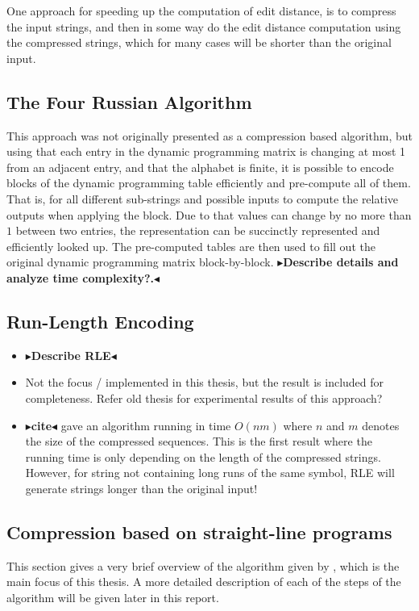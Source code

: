 \documentclass[twoside,11pt,openright]{report}
\newcommand{\todo}[1]{{\color[rgb]{.5,0,0}\textbf{$\blacktriangleright$#1$\blacktriangleleft$}}}
\begin{document}
One approach for speeding up the computation of edit distance, is to compress the input strings, and then in some way do the edit distance computation using the compressed strings, which for many cases will be shorter than the original input.

\subsection{The Four Russian Algorithm}
\label{sec:4-russian}
This approach was not originally presented as a compression based algorithm, but using that each entry in the dynamic programming matrix is changing at most 1 from an adjacent entry, and that the alphabet is finite, it is possible to encode blocks of the dynamic programming table efficiently and pre-compute all of them. That is, for all different sub-strings and possible inputs to compute the relative outputs when applying the block. Due to that values can change by no more than $1$ between two entries, the representation can be succinctly represented and efficiently looked up. The pre-computed tables are then used to fill out the original dynamic programming matrix block-by-block.
\todo{Describe details and analyze time complexity?.}

\subsection{Run-Length Encoding}
\begin{itemize}
  \item \todo{Describe RLE}
  \item Not the focus / implemented in this thesis, but the result is included for completeness. Refer old thesis for experimental results of this approach?
  \item \todo{cite} gave an algorithm running in time $O(nm)$ where $n$ and $m$ denotes the size of the compressed sequences. This is the first result where the running time is only depending on the length of the compressed strings. However, for string not containing long runs of the same symbol, RLE will generate strings longer than the original input!
\end{itemize}

\subsection{Compression based on straight-line programs}
\label{sec:edit-dist-on-slps-steps}
This section gives a very brief overview of the algorithm given by \cite{Gawrychowski:2012:FAC:2422024.2422048}, which is the main focus of this thesis. A more detailed description of each of the steps of the algorithm will be given later in this report. 
\end{document}
